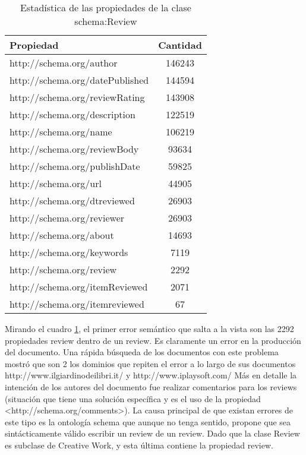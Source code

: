\begin{table}[h]
\begin{tabular}{| l | c | }\hline
 Propiedad & Cantidad \\\hline
 http://schema.org/author & 146243 \\
 http://schema.org/datePublished & 144594 \\
 http://schema.org/reviewRating & 143908 \\
 http://schema.org/description & 122519 \\
 http://schema.org/name & 106219 \\
 http://schema.org/reviewBody & 93634 \\
 http://schema.org/publishDate & 59825 \\
 http://schema.org/url & 44905 \\
 http://schema.org/dtreviewed & 26903 \\
 http://schema.org/reviewer & 26903 \\
 http://schema.org/about & 14693 \\
 http://schema.org/keywords & 7119 \\
 http://schema.org/review & 2292 \\
 http://schema.org/itemReviewed & 2071 \\
 http://schema.org/itemreviewed & 67 \\\hline
\end{tabular}
\caption{Estadística de las propiedades de la clase schema:Review}
\label{table:PropertiesStatisticsSchema}
\end{table}

 \noindent Mirando el cuadro \ref{table:PropertiesStatisticsSchema}, el primer error semántico que salta a la vista son las 2292 propiedades review dentro de un review. 
 Es claramente un error en la producción del documento. 
 Una rápida búsqueda de los documentos con este problema mostró que son 2 los dominios que repiten el error a lo largo de sus documentos
 http://www.ilgiardinodeilibri.it/ y http://www.iplaysoft.com/
 Más en detalle la intención de los autores del documento fue realizar comentarios para los reviews (situación que tiene una solución específica 
 y es el uso de la propiedad <http://schema.org/comments>). 
 La causa principal de que existan errores de este tipo es la ontología schema que aunque no tenga sentido, propone que sea sintácticamente válido
 escribir un review de un review. Dado que la clase Review es subclase de Creative Work, y esta última contiene la propiedad review.
 
